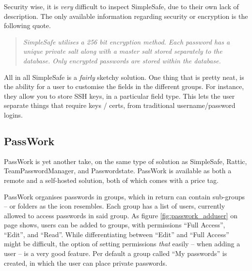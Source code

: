 			Security wise, it is \emph{very} difficult to inspect SimpleSafe, due to their own lack of description. The only available information regarding security or encryption is the following quote.
			\begin{quote}
				\emph{SimpleSafe utilises a 256 bit encryption method. Each password has a unique private salt along with a master salt stored separately to the database. Only encrypted passwords are stored within the database.}\cite{simplesafe_faq}
			\end{quote}

			All in all SimpleSafe is a \emph{fairly} sketchy solution. One thing that is pretty neat, is the ability for a user to customise the fields in the different groups. For instance, they allow you to store SSH keys, in a particular field type. This lets the user separate things that require keys / certs, from traditional username/password logins.

		\subsection*{PassWork}
			PassWork\cite{passwork} is yet another take, on the same type of solution as SimpleSafe, Rattic, TeamPasswordManager, and Passwordstate. PassWork is available as both a remote and a self-hosted solution, both of which comes with a price tag. 

			PassWork organises passwords in groups, which in return can contain sub-groups -- or folders as the icon resembles. Each group has a list of users, currently allowed to access passwords in said group. As figure \ref{fig:passwork_adduser} on page \pageref{fig:passwork_adduser} shows, users can be added to groups, with permissions ``Full Access'', ``Edit'', and ``Read''. While differentiating between ``Edit'' and ``Full Access'' might be difficult, the option of setting permissions \emph{that} easily -- when adding a user -- is a very good feature. Per default a group called ``My passwords'' is created, in which the user can place private passwords. 

